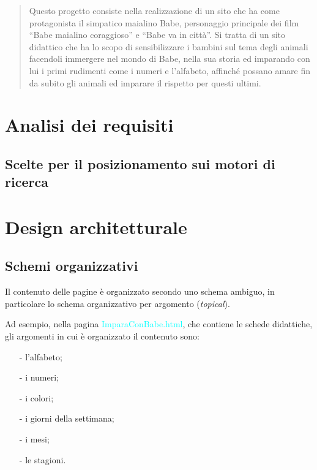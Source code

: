 \documentclass[10pt,a4paper,onecolumn]{article}
\newcommand{\sitepage}[1]{\textcolor{cyan}{\textsf{#1}}}
\newcommand{\inglese}[1]{\foreignlanguage{english}{\itshape{}#1}}
\begin{document}
\clearpage

\tableofcontents

\clearpage 

\begin{abstract}
Questo progetto consiste nella realizzazione di un sito che ha come protagonista il simpatico maialino Babe, personaggio principale dei film ``Babe maialino coraggioso'' e ``Babe va in città''.
Si tratta di un sito didattico che ha lo scopo di sensibilizzare i bambini sul tema degli animali facendoli immergere nel mondo di Babe, nella sua storia ed imparando con lui i primi rudimenti come i numeri e l'alfabeto, affinché possano amare fin da subito gli animali ed imparare il rispetto per questi ultimi.
\end{abstract}

\clearpage

\section{Analisi dei requisiti}

\subsection{Scelte per il posizionamento sui motori di ricerca}

\section{Design architetturale}
\subsection{Schemi organizzativi}
Il contenuto delle pagine è organizzato secondo uno schema ambiguo, in particolare lo schema organizzativo per argomento (\inglese{topical}).

Ad esempio, nella pagina \sitepage{ImparaConBabe.html}, che contiene le schede didattiche, gli argomenti in cui è organizzato il contenuto sono:
\begin{itemize}[noitemsep,nolistsep]
  \item[-] l'alfabeto;
  \item[-] i numeri;
  \item[-] i colori;
  \item[-] i giorni della settimana;
  \item[-] i mesi;
  \item[-] le stagioni.
\end{itemize}
\end{document}
